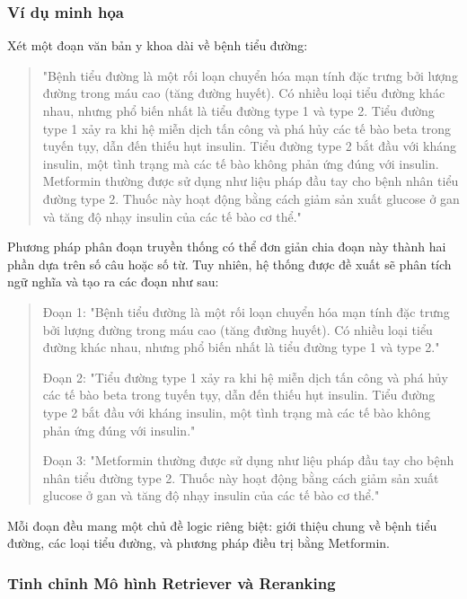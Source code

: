 \documentclass{article}
\begin{document}
\subsubsection{Ví dụ minh họa}
Xét một đoạn văn bản y khoa dài về bệnh tiểu đường:

\begin{quote}
"Bệnh tiểu đường là một rối loạn chuyển hóa mạn tính đặc trưng bởi lượng đường trong máu cao (tăng đường huyết). Có nhiều loại tiểu đường khác nhau, nhưng phổ biến nhất là tiểu đường type 1 và type 2. Tiểu đường type 1 xảy ra khi hệ miễn dịch tấn công và phá hủy các tế bào beta trong tuyến tụy, dẫn đến thiếu hụt insulin. Tiểu đường type 2 bắt đầu với kháng insulin, một tình trạng mà các tế bào không phản ứng đúng với insulin. Metformin thường được sử dụng như liệu pháp đầu tay cho bệnh nhân tiểu đường type 2. Thuốc này hoạt động bằng cách giảm sản xuất glucose ở gan và tăng độ nhạy insulin của các tế bào cơ thể."
\end{quote}

Phương pháp phân đoạn truyền thống có thể đơn giản chia đoạn này thành hai phần dựa trên số câu hoặc số từ. Tuy nhiên, hệ thống được đề xuất sẽ phân tích ngữ nghĩa và tạo ra các đoạn như sau:

\begin{quote}
Đoạn 1: "Bệnh tiểu đường là một rối loạn chuyển hóa mạn tính đặc trưng bởi lượng đường trong máu cao (tăng đường huyết). Có nhiều loại tiểu đường khác nhau, nhưng phổ biến nhất là tiểu đường type 1 và type 2."

Đoạn 2: "Tiểu đường type 1 xảy ra khi hệ miễn dịch tấn công và phá hủy các tế bào beta trong tuyến tụy, dẫn đến thiếu hụt insulin. Tiểu đường type 2 bắt đầu với kháng insulin, một tình trạng mà các tế bào không phản ứng đúng với insulin."

Đoạn 3: "Metformin thường được sử dụng như liệu pháp đầu tay cho bệnh nhân tiểu đường type 2. Thuốc này hoạt động bằng cách giảm sản xuất glucose ở gan và tăng độ nhạy insulin của các tế bào cơ thể."
\end{quote}

Mỗi đoạn đều mang một chủ đề logic riêng biệt: giới thiệu chung về bệnh tiểu đường, các loại tiểu đường, và phương pháp điều trị bằng Metformin.

\subsubsection{Tinh chỉnh Mô hình Retriever và Reranking}
\end{document}
